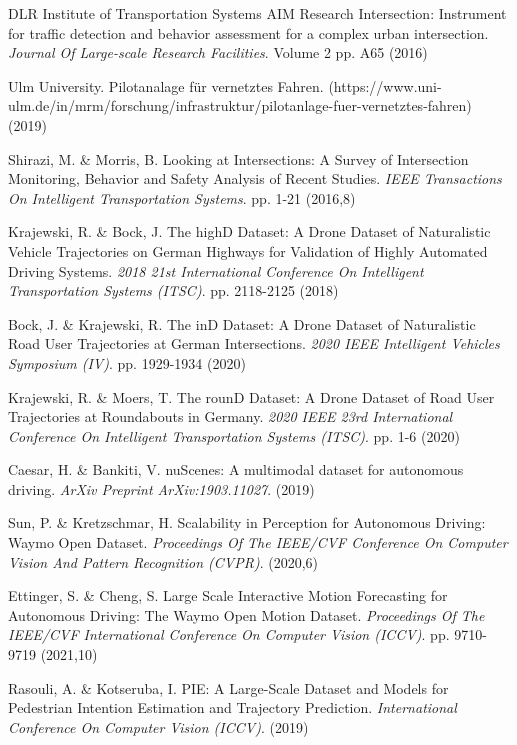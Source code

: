 \begin{thebibliography}{00}
DLR Institute of Transportation Systems AIM Research Intersection: Instrument for traffic detection and behavior assessment for a complex urban intersection. {\em Journal Of Large-scale Research Facilities}. Volume 2 pp. A65 (2016)


Ulm University. Pilotanalage für vernetztes Fahren. (https://www.uni-ulm.de/in/mrm/forschung/infrastruktur/pilotanlage-fuer-vernetztes-fahren) (2019)


Shirazi, M. \& Morris, B. Looking at Intersections: A Survey of Intersection Monitoring, Behavior and Safety Analysis of Recent Studies. {\em IEEE Transactions On Intelligent Transportation Systems}. pp. 1-21 (2016,8)


Krajewski, R. \& Bock, J. The highD Dataset: A Drone Dataset of Naturalistic Vehicle Trajectories on German Highways for Validation of Highly Automated Driving Systems. {\em 2018 21st International Conference On Intelligent Transportation Systems (ITSC)}. pp. 2118-2125 (2018)


Bock, J. \& Krajewski, R. The inD Dataset: A Drone Dataset of Naturalistic Road User Trajectories at German Intersections. {\em 2020 IEEE Intelligent Vehicles Symposium (IV)}. pp. 1929-1934 (2020)


Krajewski, R. \& Moers, T. The rounD Dataset: A Drone Dataset of Road User Trajectories at Roundabouts in Germany. {\em 2020 IEEE 23rd International Conference On Intelligent Transportation Systems (ITSC)}. pp. 1-6 (2020)


Caesar, H. \& Bankiti, V. nuScenes: A multimodal dataset for autonomous driving. {\em ArXiv Preprint ArXiv:1903.11027}. (2019)


Sun, P. \& Kretzschmar, H. Scalability in Perception for Autonomous Driving: Waymo Open Dataset. {\em Proceedings Of The IEEE/CVF Conference On Computer Vision And Pattern Recognition (CVPR)}. (2020,6)


Ettinger, S. \& Cheng, S. Large Scale Interactive Motion Forecasting for Autonomous Driving: The Waymo Open Motion Dataset. {\em Proceedings Of The IEEE/CVF International Conference On Computer Vision (ICCV)}. pp. 9710-9719 (2021,10)


Rasouli, A. \& Kotseruba, I. PIE: A Large-Scale Dataset and Models for Pedestrian Intention Estimation and Trajectory Prediction. {\em International Conference On Computer Vision (ICCV)}. (2019)



\end{thebibliography}
